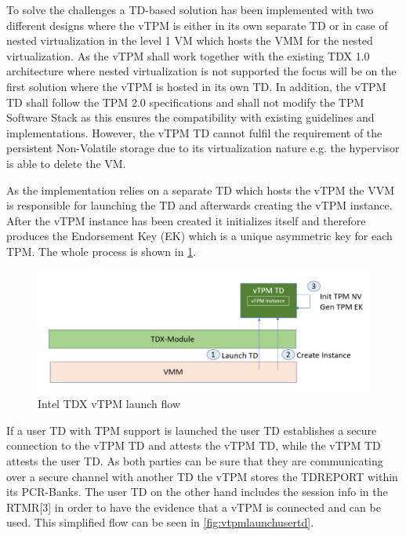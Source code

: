 \documentclass[sigplan,screen,nonacm]{acmart}
\begin{document}
To solve the challenges a TD-based solution has been implemented with two different designs where the vTPM is either in its own separate TD or in case of nested virtualization in the level 1 VM which hosts the VMM for the nested virtualization.
As the vTPM shall work together with the existing TDX 1.0 architecture where nested virtualization is not supported the focus will be on the first solution where the vTPM is hosted in its own TD\cite[p. 5]{Intel-vTPM}.
In addition, the vTPM TD shall follow the TPM 2.0 specifications and shall not modify the TPM Software Stack as this ensures the compatibility with existing guidelines and implementations\cite[p. 5]{Intel-vTPM}.
However, the vTPM TD cannot fulfil the requirement of the persistent Non-Volatile storage due to its virtualization nature e.g. the hypervisor is able to delete the VM.

As the implementation relies on a separate TD which hosts the vTPM the VVM is responsible for launching the TD and afterwards creating the vTPM instance.
After the vTPM instance has been created it initializes itself and therefore produces the Endorsement Key (EK) which is a unique asymmetric key for each TPM.
The whole process is shown in \cref{fig:vtpmlaunch}.

\begin{figure}
  \centering
  \includegraphics[width=\linewidth]{pictures/vTPM_launch.png}
  \caption{Intel TDX vTPM launch flow \cite{Intel-vTPM}}
  \label{fig:vtpmlaunch}
\end{figure}

If a user TD with TPM support is launched the user TD establishes a secure connection to the vTPM TD and attests the vTPM TD, while the vTPM TD attests the user TD.
As both parties can be sure that they are communicating over a secure channel with another TD the vTPM stores the TDREPORT within its PCR-Banks.
The user TD on the other hand includes the session info in the RTMR[3] in order to have the evidence that a vTPM is connected and can be used.
This simplified flow can be seen in \cref{fig:vtpmlaunchusertd}.
\end{document}
